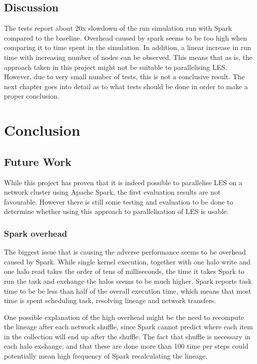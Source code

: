 \documentclass{l4proj}
\begin{document}
\section{Discussion}

The tests report about 20x slowdown of the run simulation run with Spark compared to
the baseline. Overhead caused by spark seems to be too high when comparing it to time spent 
in the simulation. In addition, a linear increase in run time with increasing number of nodes
can be observed. This means that as is, the approach taken in this project might not
be suitable to parallelising LES. However, due to very small number of tests, 
this is not a conclusive result. The next chapter goes into detail as to what tests
should be done in order to make a proper conclusion.

\chapter{Conclusion}
\label{chap:conclusion}

\section{Future Work}

While this project has proven that it is indeed possible to parallelise LES
on a network cluster using Apache Spark, the first evaluation results are
not favourable. However there is still some testing and evaluation to be done
to determine whether using this approach to parallelisation of LES is usable.

\subsection{Spark overhead}

The biggest issue that is causing the adverse performance seems to be overhead
caused by Spark. While single kernel execution, together with one halo write and
one halo read takes the order of tens of milliseconds, the time it takes Spark
to run the task and exchange the halos seems to be much higher. Spark reports
task time to be be less than half of the overall execution time, which means
that most time is spent scheduling task, resolving lineage and network transfers.

One possible explanation of the high overhead might be the need to recompute the
lineage after each network shuffle, since Spark cannot predict where each item
in the collection will end up after the shuffle. The fact that shuffle is necessary
in each halo exchange, and that these are done more than 100 time per steps could
potentially mean high frequency of Spark recalculating the lineage.
\end{document}
